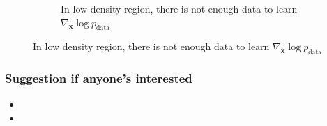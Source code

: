 \documentclass[10pt,xcolor={usenames,dvipsnames,table}]{beamer}
\begin{document}
\begin{frame}
\begin{figure}
\begin{subfigure}{0.35\textwidth}
            \caption{In low density region, there is not enough data to learn $\nabla_{\bm{x}} \log p_{\text{data}}$ }
        \end{subfigure}
    \end{figure}
\end{frame}

\begin{frame}
    \frametitle{Suggestion if anyone's interested}
    \begin{itemize}
        \item {}
        \item {}
    \end{itemize}
    
\end{frame}

%
\end{document}
